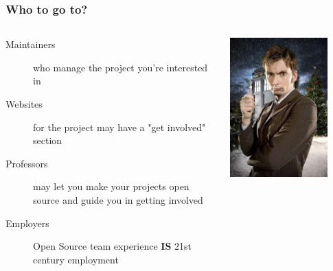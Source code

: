 \documentclass{beamer}
\begin{document}
\begin{frame}
  \frametitle{Who to go to?}
  \begin{columns}[c]
    \begin{description}
    \item[Maintainers] who manage the project you're interested in
    \item[Websites] for the project may have a "get involved" section
    \item[Professors] may let you make your projects open source and guide you in getting involved
    \item[Employers] Open Source team experience \textbf{IS} 21st century employment
    \end{description}
    \includegraphics[width=0.8\textwidth]{../img/dr-who}
  \end{columns}
\end{frame}
\end{document}
